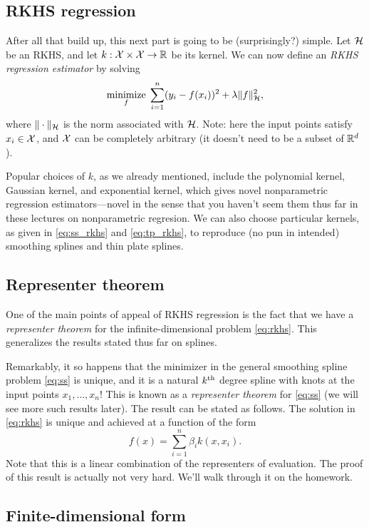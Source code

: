 \documentclass{article}
\begin{document}
\subsection{RKHS regression}

After all that build up, this next part is going to be (surprisingly?)
simple. Let $\mathcal{H}$ be an RKHS, and let $k : \mathcal{X} \times \mathcal{X} \to \mathbb{R}$ be its
kernel. We can now define an \emph{RKHS regression estimator} by solving 
\begin{equation}
\label{eq:rkhs}
\mathop{\mathrm{minimize}}_f \; \sum_{i=1}^n (y_i - f(x_i))^2 + \lambda \|f\|_{\mathcal{H}}^2,
\end{equation}
where $\|\cdot\|_{\mathcal{H}}$ is the norm associated with $\mathcal{H}$. Note: here the input
points satisfy $x_i \in \mathcal{X}$, and $\mathcal{X}$ can be completely arbitrary (it doesn't
need to be a subset of $\mathbb{R}^d$). 

Popular choices of $k$, as we already mentioned, include the polynomial kernel,
Gaussian kernel, and exponential kernel, which gives novel nonparametric
regression estimators---novel in the sense that you haven't seem them thus far
in these lectures on nonparametric regresion. We can also choose particular
kernels, as given in \eqref{eq:ss_rkhs} and \eqref{eq:tp_rkhs}, to reproduce (no
pun in intended) smoothing splines and thin plate splines. 

\subsection{Representer theorem}

One of the main points of appeal of RKHS regression is the fact that we have a
\emph{representer theorem} for the infinite-dimensional problem \eqref{eq:rkhs}.
This generalizes the results stated thus far on splines.

Remarkably, it so happens that the minimizer in the general smoothing spline
problem \eqref{eq:ss} is unique, and it is a natural $k^{\text{th}}$ degree spline with 
knots at the input points $x_1,\dots,x_n$! This is known as a \emph{representer
  theorem} for \eqref{eq:ss} (we will see more such results later). The result
can be stated as follows. The solution in \eqref{eq:rkhs} is unique and achieved
at a function of the form 
\[
f(x) = \sum_{i=1}^n \beta_i k(x, x_i).
\]
Note that this is a linear combination of the representers of evaluation. The
proof of this result is actually not very hard. We'll walk through it on the
homework.  

\subsection{Finite-dimensional form}
\end{document}
